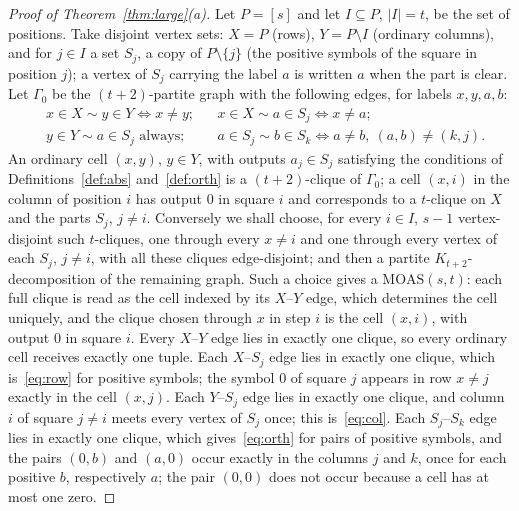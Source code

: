 \documentclass[11pt]{amsart}
\theoremstyle{definition}\newtheorem{definition}[theorem]{Definition}
\theoremstyle{remark}\newtheorem{remark}[theorem]{Remark}
\newcommand{\MOAS}{\mathrm{MOAS}}
\begin{document}
\begin{proof}[Proof of Theorem~\ref{thm:large}(a)]
Let $P=[s]$ and let $I\subseteq P$, $|I|=t$, be the set of positions. Take disjoint vertex sets: $X=P$ (rows),
$Y=P\setminus I$ (ordinary columns), and for $j\in I$ a set $S_j$, a copy of $P\setminus\{j\}$ (the positive
symbols of the square in position $j$); a vertex of $S_j$ carrying the label $a$ is written $a$ when the part is
clear. Let $\Gamma_0$ be the $(t+2)$-partite graph with the following edges, for labels $x,y,a,b$:
\begin{align*}
&x\in X\sim y\in Y \iff x\ne y; && x\in X\sim a\in S_j\iff x\ne a;\\
&y\in Y\sim a\in S_j \text{ always}; && a\in S_j\sim b\in S_k\iff a\ne b,\ (a,b)\ne(k,j).
\end{align*}
An ordinary cell $(x,y)$, $y\in Y$, with outputs $a_j\in S_j$ satisfying the conditions of Definitions~\ref{def:abs}
and~\ref{def:orth} is a $(t+2)$-clique of $\Gamma_0$; a cell $(x,i)$ in the column of position $i$ has output $0$ in
square $i$ and corresponds to a $t$-clique on $X$ and the parts $S_j$, $j\ne i$. Conversely we shall choose, for
every $i\in I$, $s-1$ vertex-disjoint such $t$-cliques, one through every $x\ne i$ and one through every vertex of each
$S_j$, $j\ne i$, with all these cliques edge-disjoint; and then a partite $K_{t+2}$-decomposition of the remaining
graph. Such a choice gives a $\MOAS(s,t)$: each full clique is read as the cell indexed by its $X$--$Y$ edge, which
determines the cell uniquely, and the clique chosen through $x$ in step $i$ is the cell $(x,i)$, with output $0$ in
square $i$. Every $X$--$Y$ edge lies in exactly one clique, so every ordinary cell receives exactly one tuple. Each
$X$--$S_j$ edge lies in exactly one clique, which is~\eqref{eq:row} for positive symbols; the symbol $0$ of square $j$
appears in row $x\ne j$ exactly in the cell $(x,j)$. Each $Y$--$S_j$ edge lies in exactly one clique, and column $i$ of
square $j\ne i$ meets every vertex of $S_j$ once; this is~\eqref{eq:col}. Each $S_j$--$S_k$ edge lies in exactly one
clique, which gives~\eqref{eq:orth} for pairs of positive symbols, and the pairs $(0,b)$ and $(a,0)$ occur exactly in
the columns $j$ and $k$, once for each positive $b$, respectively $a$; the pair $(0,0)$ does not occur because a cell
has at most one zero.


\end{proof}
\end{document}
